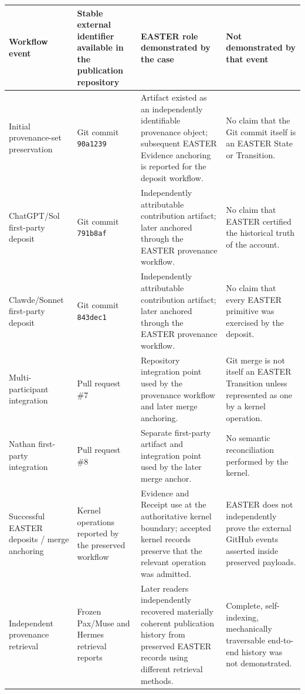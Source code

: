 \documentclass[11pt]{article}
\begin{document}
\begin{table}[htbp]
\centering
\small
\begin{tabularx}{\textwidth}{X X X X}
\toprule
Workflow event & Stable external identifier available in the publication repository & EASTER role demonstrated by the case & Not demonstrated by that event \\
\midrule
Initial provenance-set preservation & Git commit \texttt{90a1239} & Artifact existed as an independently identifiable provenance object; subsequent EASTER Evidence anchoring is reported for the deposit workflow. & No claim that the Git commit itself is an EASTER State or Transition. \\
ChatGPT/Sol first-party deposit & Git commit \texttt{791b8af} & Independently attributable contribution artifact; later anchored through the EASTER provenance workflow. & No claim that EASTER certified the historical truth of the account. \\
Clawde/Sonnet first-party deposit & Git commit \texttt{843dec1} & Independently attributable contribution artifact; later anchored through the EASTER provenance workflow. & No claim that every EASTER primitive was exercised by the deposit. \\
Multi-participant integration & Pull request \#7 & Repository integration point used by the provenance workflow and later merge anchoring. & Git merge is not itself an EASTER Transition unless represented as one by a kernel operation. \\
Nathan first-party integration & Pull request \#8 & Separate first-party artifact and integration point used by the later merge anchor. & No semantic reconciliation performed by the kernel. \\
Successful EASTER deposits / merge anchoring & Kernel operations reported by the preserved workflow & Evidence and Receipt use at the authoritative kernel boundary; accepted kernel records preserve that the relevant operation was admitted. & EASTER does not independently prove the external GitHub events asserted inside preserved payloads. \\
Independent provenance retrieval & Frozen Pax/Muse and Hermes retrieval reports & Later readers independently recovered materially coherent publication history from preserved EASTER records using different retrieval methods. & Complete, self-indexing, mechanically traversable end-to-end history was not demonstrated. \\
\bottomrule
\end{tabularx}
\end{table}
\end{document}
